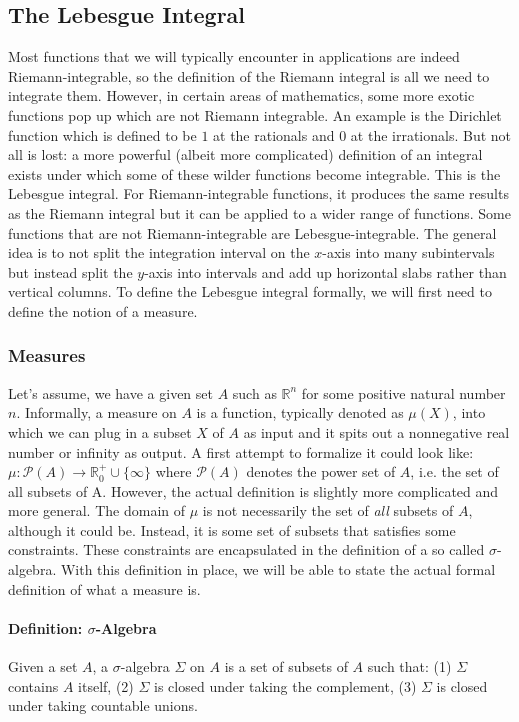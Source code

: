 \subsection{The Lebesgue Integral} 
Most functions that we will typically encounter in applications are indeed Riemann-integrable, so the definition of the Riemann integral is all we need to integrate them. However, in certain areas of mathematics, some more exotic functions pop up which are not Riemann integrable. An example is the Dirichlet function which is defined to be $1$ at the rationals and $0$ at the irrationals. But not all is lost: a more powerful (albeit more complicated) definition of an integral exists under which some of these wilder functions become integrable. This is the Lebesgue integral. For Riemann-integrable functions, it produces the same results as the Riemann integral but it can be applied to a wider range of functions. Some functions that are not Riemann-integrable are Lebesgue-integrable. The general idea is to not split the integration interval on the $x$-axis into many subintervals but instead split the $y$-axis into intervals and add up horizontal slabs rather than vertical columns. To define the Lebesgue integral formally, we will first need to define the notion of a measure.


\subsubsection{Measures}
Let's assume, we have a given set $A$ such as $\mathbb{R}^n$ for some positive natural number $n$. Informally, a measure on $A$ is a function, typically denoted as $\mu(X)$, into which we can plug in a subset $X$ of $A$ as input and it spits out a nonnegative real number or infinity as output. A first attempt to formalize it could look like: $\mu: \mathcal{P}(A) \rightarrow \mathbb{R}^+_0 \cup \{  \infty \}$ where $\mathcal{P}(A)$ denotes the power set of $A$, i.e. the set of all subsets of A. However, the actual definition is slightly more complicated and more general. The domain of $\mu$ is not necessarily the set of \emph{all} subsets of $A$, although it could be. Instead, it is some set of subsets that satisfies some constraints. These constraints are encapsulated in the definition of a so called $\sigma$-algebra. With this definition in place, we will be able to state the actual formal definition of what a measure is.

\paragraph{Definition: $\sigma$-Algebra} \label{Def:SigmaAlgebra} Given a set $A$, a $\sigma$-algebra $\Sigma$ on $A$ is a set of subsets of $A$ such that: (1) $\Sigma$ contains $A$ itself, (2) $\Sigma$ is closed under taking the complement, (3) $\Sigma$ is closed under taking countable unions.

